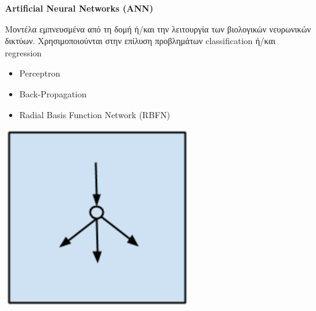 \begin{minipage}{0.5\textwidth}

  \textbf{\large Artificial Neural Networks (ANN)}

  Μοντέλα εμπνευσμένα από τη δομή ή/και την λειτουργία των βιολογικών νευρωνικών δικτύων.
  Χρησιμοποιούνται στην επίλυση προβλημάτων classification ή/και regression
  \begin{itemize}
    \setlength\itemsep{0em}
    \item{Perceptron}
    \item{Back-Propagation}
    \item{Radial Basis Function Network (RBFN)}
  \end{itemize}
\end{minipage}
\begin{minipage}{0.5\textwidth}
  \begin{center}
    \includegraphics[width=0.6\textwidth]{./images/chapter3/artificial_neural_network_algorithms.png}
  \end{center}
\end{minipage}

